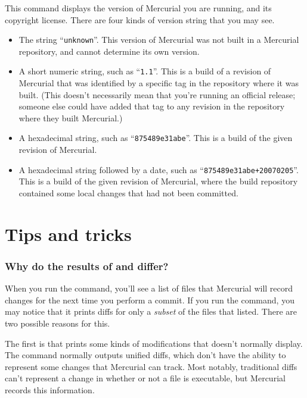 This command displays the version of Mercurial you are running, and
its copyright license.  There are four kinds of version string that
you may see.
\begin{itemize}
\item The string ``\texttt{unknown}''. This version of Mercurial was
  not built in a Mercurial repository, and cannot determine its own
  version.
\item A short numeric string, such as ``\texttt{1.1}''. This is a
  build of a revision of Mercurial that was identified by a specific
  tag in the repository where it was built.  (This doesn't necessarily
  mean that you're running an official release; someone else could
  have added that tag to any revision in the repository where they
  built Mercurial.)
\item A hexadecimal string, such as ``\texttt{875489e31abe}''.  This
  is a build of the given revision of Mercurial.
\item A hexadecimal string followed by a date, such as
  ``\texttt{875489e31abe+20070205}''.  This is a build of the given
  revision of Mercurial, where the build repository contained some
  local changes that had not been committed.
\end{itemize}

\section{Tips and tricks}

\subsubsection{Why do the results of  and 
  differ?}
\label{cmdref:diff-vs-status}

When you run the  command, you'll see a list of files
that Mercurial will record changes for the next time you perform a
commit.  If you run the  command, you may notice that it
prints diffs for only a \emph{subset} of the files that 
listed.  There are two possible reasons for this.

The first is that  prints some kinds of modifications
that  doesn't normally display.  The  command
normally outputs unified diffs, which don't have the ability to
represent some changes that Mercurial can track.  Most notably,
traditional diffs can't represent a change in whether or not a file is
executable, but Mercurial records this information.

